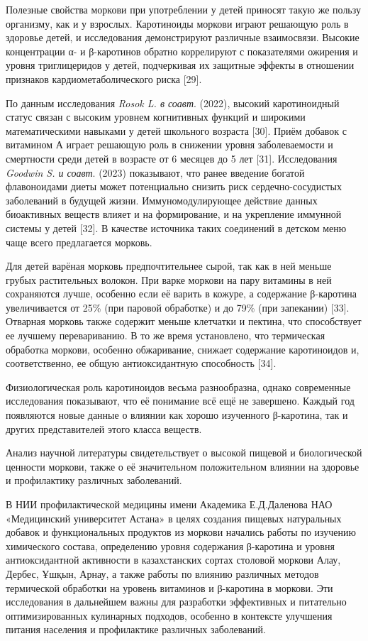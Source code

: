 \begin{multicols}{2}
Полезные свойства моркови при употреблении у детей приносят такую же
пользу организму, как и у взрослых. Каротиноиды моркови играют решающую
роль в здоровье детей, и исследования демонстрируют различные
взаимосвязи. Высокие концентрации α- и β-каротинов обратно коррелируют с
показателями ожирения и уровня триглицеридов у детей, подчеркивая их
защитные эффекты в отношении признаков кардиометаболического риска
{[}29{]}.

По данным исследования \emph{Rosok L. в соавт}. (2022), высокий
каротиноидный статус связан с высоким уровнем когнитивных функций и
широкими математическими навыками у детей школьного возраста {[}30{]}.
Приём добавок с витамином А играет решающую роль в снижении уровня
заболеваемости и смертности среди детей в возрасте от 6 месяцев до 5 лет
{[}31{]}. Исследования \emph{Goodwin S. и соавт}. (2023) показывают, что
ранее введение богатой флавоноидами диеты может потенциально снизить
риск сердечно-сосудистых заболеваний в будущей жизни. Иммуномодулирующее
действие данных биоактивных веществ влияет и на формирование, и на
укрепление иммунной системы у детей {[}32{]}. В качестве источника таких
соединений в детском меню чаще всего предлагается морковь.

Для детей варёная морковь предпочтительнее сырой, так как в ней меньше
грубых растительных волокон. При варке моркови на пару витамины в ней
сохраняются лучше, особенно если её варить в кожуре, а содержание
β-каротина увеличивается от 25\% (при паровой обработке) и до 79\% (при
запекании) {[}33{]}. Отварная морковь также содержит меньше клетчатки и
пектина, что способствует ее лучшему перевариванию. В то же время
установлено, что термическая обработка моркови, особенно обжаривание,
снижает содержание каротиноидов и, соответственно, ее общую
антиоксидантную способность {[}34{]}.

Физиологическая роль каротиноидов весьма разнообразна, однако
современные исследования показывают, что её понимание всё ещё не
завершено. Каждый год появляются новые данные о влиянии как хорошо
изученного β-каротина, так и других представителей этого класса веществ.

Анализ научной литературы свидетельствует о высокой пищевой и
биологической ценности моркови, также о её значительном положительном
влиянии на здоровье и профилактику различных заболеваний.

В НИИ профилактической медицины имени Академика Е.Д.Даленова НАО
«Медицинский университет Астана» в целях создания пищевых натуральных
добавок и функциональных продуктов из моркови начались работы по
изучению химического состава, определению уровня содержания β-каротина и
уровня антиоксидантной активности в казахстанских сортах столовой
моркови Алау, Дербес, Ұшқын, Арнау, а также работы по влиянию различных
методов термической обработки на уровень витаминов и β-каротина в
моркови. Эти исследования в дальнейшем важны для разработки эффективных
и питательно оптимизированных кулинарных подходов, особенно в контексте
улучшения питания населения и профилактике различных заболеваний.


\end{multicols}
